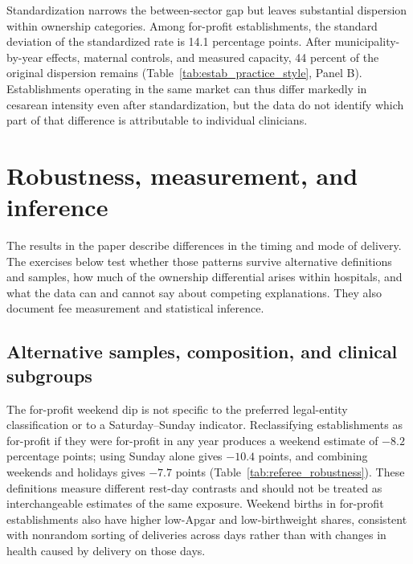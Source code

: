 Standardization narrows the between-sector gap but leaves substantial dispersion
within ownership categories. Among for-profit establishments, the standard
deviation of the standardized rate is 14.1 percentage points. After
municipality-by-year effects, maternal controls, and measured capacity, 44 percent
of the original dispersion remains (Table~\ref{tab:estab_practice_style},
Panel B). Establishments operating in the same market can thus differ markedly in
cesarean intensity even after standardization, but the data do not identify which
part of that difference is attributable to individual clinicians.



\section{Robustness, measurement, and inference}\label{app:robustness}

The results in the paper describe differences in the timing and mode of delivery.
The exercises below test whether those patterns survive alternative definitions
and samples, how much of the ownership differential arises within hospitals, and
what the data can and cannot say about competing explanations. They also document
fee measurement and statistical inference.

\subsection{Alternative samples, composition, and clinical subgroups}

The for-profit weekend dip is not specific to the preferred legal-entity
classification or to a Saturday--Sunday indicator. Reclassifying establishments as
for-profit if they were for-profit in any year produces a weekend estimate of
$-8.2$ percentage points; using Sunday alone gives $-10.4$ points, and combining
weekends and holidays gives $-7.7$ points (Table~\ref{tab:referee_robustness}).
These definitions measure different rest-day contrasts and should not be treated
as interchangeable estimates of the same exposure. Weekend births in for-profit
establishments also have higher low-Apgar and low-birthweight shares, consistent
with nonrandom sorting of deliveries across days rather than with changes in
health caused by delivery on those days.

